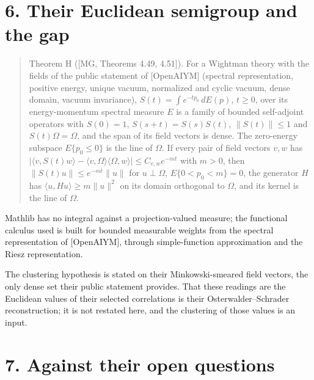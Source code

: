 \documentclass[10pt,letterpaper,twocolumn]{article}
\begin{document}
\section{6. Their Euclidean semigroup and the gap}\label{6-their-euclidean-semigroup-and-the-gap}

\begin{quote}
Theorem H ({[}MG, Theorems 4.49, 4.51{]}). For a Wightman theory with the fields of the public statement of {[}OpenAIYM{]} (spectral representation, positive energy, unique vacuum, normalized and cyclic vacuum, dense domain, vacuum invariance), \(S(t)=\int e^{-tp_0}\,dE(p)\), \(t\ge0\), over its energy-momentum spectral measure \(E\) is a family of bounded self-adjoint operators with \(S(0)=1\), \(S(s+t)=S(s)S(t)\), \(\lVert S(t)\rVert\le1\) and \(S(t)\Omega=\Omega\), and the span of its field vectors is dense. The zero-energy subspace \(E\{p_0\le0\}\) is the line of \(\Omega\). If every pair of field vectors \(v,w\) has \(\lvert\langle v,S(t)w\rangle-\langle v,\Omega\rangle\langle\Omega,w\rangle\rvert\le C_{v,w}e^{-mt}\) with \(m>0\), then \(\lVert S(t)u\rVert\le e^{-mt}\lVert u\rVert\) for \(u\perp\Omega\), \(E\{0<p_0<m\}=0\), the generator \(H\) has \(\langle u,Hu\rangle\ge m\lVert u\rVert^2\) on its domain orthogonal to \(\Omega\), and its kernel is the line of \(\Omega\).
\end{quote}

Mathlib has no integral against a projection-valued measure; the functional calculus used is built for bounded measurable weights from the spectral representation of {[}OpenAIYM{]}, through simple-function approximation and the Riesz representation.

The clustering hypothesis is stated on their Minkowski-smeared field vectors, the only dense set their public statement provides. That these readings are the Euclidean values of their selected correlations is their Osterwalder--Schrader reconstruction; it is not restated here, and the clustering of those values is an input.

\section{7. Against their open questions}\label{7-against-their-open-questions}
\end{document}
